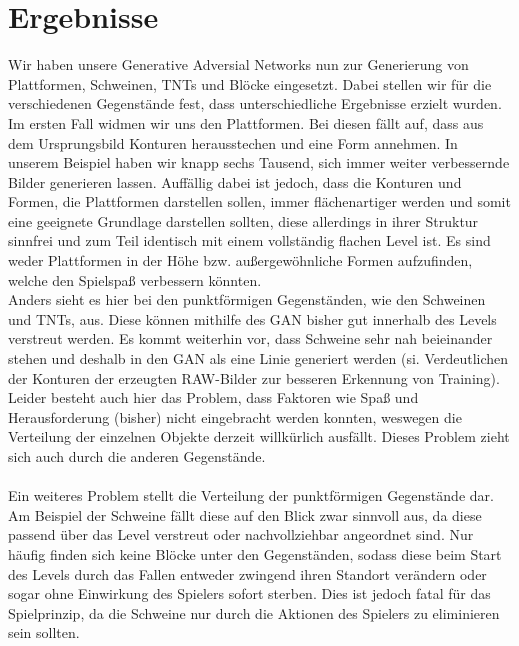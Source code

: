\documentclass[11pt]{article}
\begin{document}
\section{Ergebnisse}
Wir haben unsere Generative Adversial Networks nun zur Generierung von Plattformen, Schweinen, TNTs und Blöcke eingesetzt. Dabei stellen wir für die verschiedenen Gegenstände fest, dass unterschiedliche Ergebnisse erzielt wurden. Im ersten Fall widmen wir uns den Plattformen. Bei diesen fällt auf, dass aus dem Ursprungsbild Konturen herausstechen und eine Form annehmen. In unserem Beispiel haben wir knapp sechs Tausend, sich immer weiter verbessernde Bilder generieren lassen. Auffällig dabei ist jedoch, dass die Konturen und Formen, die Plattformen darstellen sollen, immer flächenartiger werden und somit eine geeignete Grundlage darstellen sollten, diese allerdings in ihrer Struktur sinnfrei und zum Teil identisch mit einem vollständig flachen Level ist. Es sind weder Plattformen in der Höhe bzw. außergewöhnliche Formen aufzufinden, welche den Spielspaß verbessern könnten. \\ Anders sieht es hier bei den punktförmigen Gegenständen, wie den Schweinen und TNTs, aus. Diese können mithilfe des GAN bisher gut innerhalb des Levels verstreut werden. Es kommt weiterhin vor, dass Schweine sehr nah beieinander stehen und deshalb in den GAN als eine Linie generiert werden (si. Verdeutlichen der Konturen der erzeugten RAW-Bilder zur besseren Erkennung von Training). Leider besteht auch hier das Problem, dass Faktoren wie Spaß und Herausforderung (bisher) nicht eingebracht werden konnten, weswegen die Verteilung der einzelnen Objekte derzeit willkürlich ausfällt. Dieses Problem zieht sich auch durch die anderen Gegenstände. \\ \\Ein weiteres Problem stellt die Verteilung der punktförmigen Gegenstände dar. Am Beispiel der Schweine fällt diese auf den Blick zwar sinnvoll aus, da diese passend über das Level verstreut oder nachvollziehbar angeordnet sind. Nur häufig finden sich keine Blöcke unter den Gegenständen, sodass diese beim Start des Levels durch das Fallen entweder zwingend ihren Standort verändern oder sogar ohne Einwirkung des Spielers sofort sterben. Dies ist jedoch fatal für das Spielprinzip, da die Schweine nur durch die Aktionen des Spielers zu eliminieren sein sollten.
\end{document}
